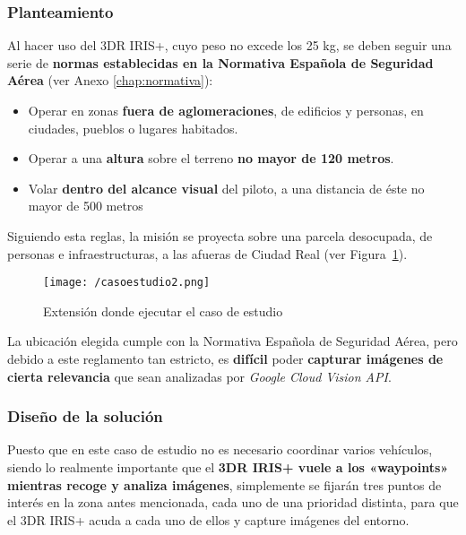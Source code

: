 \subsubsection{Planteamiento}

Al hacer uso del 3DR IRIS+, cuyo peso no excede los 25 kg, se deben seguir una serie de \textbf{normas establecidas en la Normativa Española de Seguridad Aérea} (ver Anexo \ref{chap:normativa}):

\begin{itemize}
\item Operar en zonas \textbf{fuera de aglomeraciones}, de edificios y personas, en ciudades, pueblos o lugares habitados.
\item Operar a una \textbf{altura} sobre el terreno \textbf{no mayor de 120 metros}.
\item Volar \textbf{dentro del alcance visual} del piloto, a una distancia de éste no mayor de 500 metros
\end{itemize}

Siguiendo esta reglas, la misión se proyecta sobre una parcela desocupada, de personas e infraestructuras, a las afueras de Ciudad Real (ver Figura~\ref{fig:instalacion2}).

\begin{figure}[!h]
\begin{center}
\texttt{[image: /casoestudio2.png]}
\caption[Extensión donde ejecutar el caso de estudio]{Extensión donde ejecutar el caso de estudio}
\label{fig:instalacion2}
\end{center}
\end{figure}

La ubicación elegida cumple con la Normativa Española de Seguridad Aérea, pero debido a este reglamento tan estricto, es \textbf{difícil} poder \textbf{capturar imágenes de cierta relevancia} que sean analizadas por \textit{Google Cloud Vision \acs{API}}.

\subsubsection{Diseño de la solución}

Puesto que en este caso de estudio no es necesario coordinar varios vehículos, siendo lo realmente importante que el \textbf{3DR IRIS+ vuele a los «waypoints» mientras recoge y analiza imágenes}, simplemente se fijarán tres puntos de interés en la zona antes mencionada, cada uno de una prioridad distinta, para que el 3DR IRIS+ acuda a cada uno de ellos y capture imágenes del entorno.

